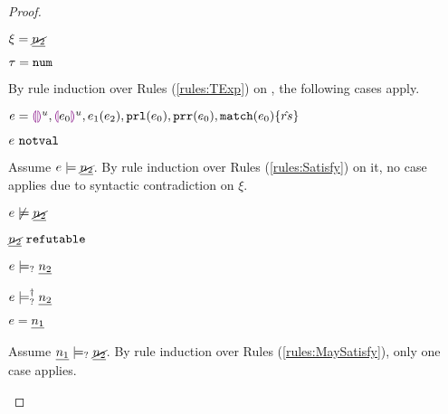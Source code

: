 \begin{proof}
\begin{byCases}
\item[\text{(\ref{rule:CTNotNum})}]
    \begin{pfsteps*}
    \item $\xi=\underline{\cancel{n_2}}$ 
    \item $\tau=\mathtt{num}$ 
    \end{pfsteps*}
    By rule induction over Rules (\ref{rules:TExp}) on , the following cases apply.
    \begin{byCases}
    \item[\text{(\ref{rule:TEHole}),(\ref{rule:THole}),(\ref{rule:TAp}),(\ref{rule:TPrl}),(\ref{rule:TPrr}),(\ref{rule:TMatchZPre}),(\ref{rule:TMatchNZPre})}]
        \begin{pfsteps*}
        \item $e=\textcolor{violet}{\llparenthesis}\textcolor{violet}{\rrparenthesis}^{u},\textcolor{violet}{\llparenthesis} e_0\textcolor{violet}{\rrparenthesis}^{u},e_1(e_2),\mathtt{prl}(e_0),\mathtt{prr}(e_0),\mathtt{match}(e_0) \{\hat{rs}\}$ 
         \item $e ~\mathtt{notval}$  
        \end{pfsteps*}
        Assume $e \models \underline{\cancel{n_2}}$. By rule induction over Rules (\ref{rules:Satisfy}) on it, no case applies due to syntactic contradiction on $\xi$.
        \begin{pfsteps*}
        \item $e \not\models \underline{\cancel{n_2}}$ 
        \item $\underline{\cancel{n_2}} ~\mathtt{refutable}$  
        \item $e \models_{?} \underline{n_2}$  
        \item $e \models_{?}^{\dag} \underline{n_2}$  
        \end{pfsteps*}
    \item[\text{(\ref{rule:TNum})}]
        \begin{pfsteps*}
        \item $e=\underline{n_1}$ 
        \end{pfsteps*}
        Assume $\underline{n_1} \models_{?} \underline{\cancel{n_2}}$. By rule induction over Rules (\ref{rules:MaySatisfy}), only one case applies.
        \begin{byCases}

\end{byCases}
\end{byCases}
\end{byCases}
\end{proof}
